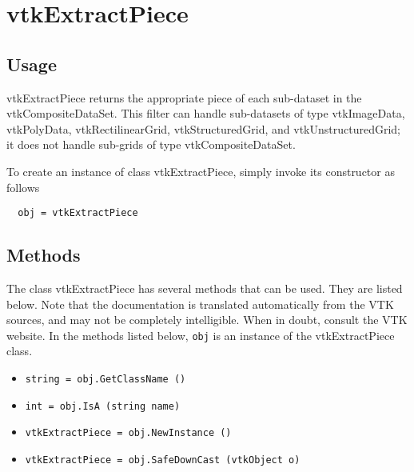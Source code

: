 \section{vtkExtractPiece}

\subsection{Usage}

 vtkExtractPiece returns the appropriate piece of each
 sub-dataset in the vtkCompositeDataSet.
 This filter can handle sub-datasets of type vtkImageData, vtkPolyData,
 vtkRectilinearGrid, vtkStructuredGrid, and vtkUnstructuredGrid; it does
 not handle sub-grids of type vtkCompositeDataSet.

To create an instance of class vtkExtractPiece, simply
invoke its constructor as follows
\begin{verbatim}
  obj = vtkExtractPiece
\end{verbatim}
\subsection{Methods}

The class vtkExtractPiece has several methods that can be used.
  They are listed below.
Note that the documentation is translated automatically from the VTK sources,
and may not be completely intelligible.  When in doubt, consult the VTK website.
In the methods listed below, \verb|obj| is an instance of the vtkExtractPiece class.
\begin{itemize}
\item  \verb|string = obj.GetClassName ()|

\item  \verb|int = obj.IsA (string name)|

\item  \verb|vtkExtractPiece = obj.NewInstance ()|

\item  \verb|vtkExtractPiece = obj.SafeDownCast (vtkObject o)|

\end{itemize}
